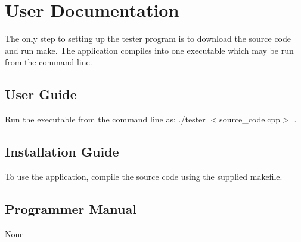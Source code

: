 
\chapter{User Documentation}


The only step to setting up the tester program is to download the source code and run 
make. The application compiles into one executable which may be run from the command line.

\section{User Guide}
Run the executable from the command line as: ./tester $<$source\_code.cpp$>$ .


\section{Installation Guide}
To use the application, compile the source code using the supplied makefile.

\section{Programmer Manual}
None